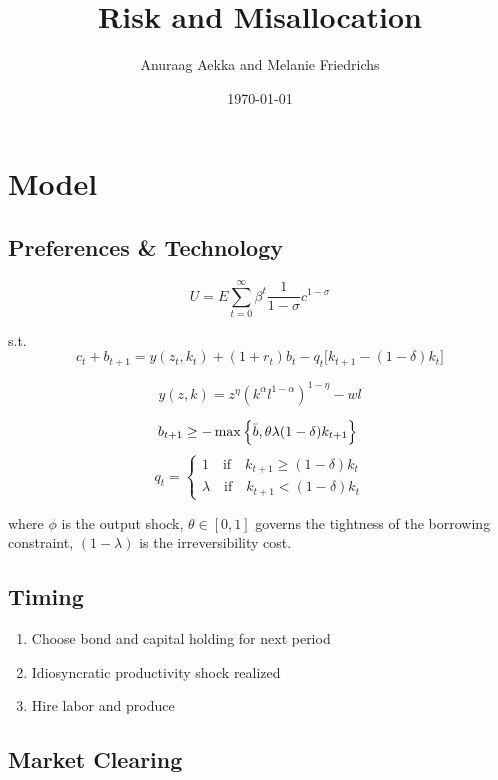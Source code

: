 \documentclass{article}
\title{Risk and Misallocation}
\author{Anuraag Aekka and Melanie Friedrichs}
\date{\today}
\begin{document}
\maketitle

\section{Model}

\subsection{Preferences \& Technology}

\[U= E\sum_{t=0}^{\infty}\beta^t \frac{1}{1-\sigma}c^{1-\sigma} \]


s.t. 
\[c_t + b_{t+1} = y(z_t,k_t) + (1+r_t)b_t - q_{t} \big[k_{t+1} - (1-\delta)k_t \big]\]

\[y(z,k) = z^{\eta}\left(k^{\alpha}l^{1-\alpha}\right)^{1-\eta} - wl\]

\[b_{t+1}\geq -\max\Big\{\Bar{b},\theta\lambda(1-\delta)k_{t+1}\Big\}\  \]
\[q_t =
\begin{cases}
1 \quad \text{if} \quad k_{t+1} \geq (1-\delta)k_t\\
\lambda \quad \text{if}\quad  k_{t+1} < (1-\delta)k_t  
\end{cases}\]



where $\phi$ is the output shock, $\theta \in [0,1]$ governs the tightness of the borrowing constraint, $(1-\lambda)$ is the irreversibility cost.
\iffalse
\[k_{t+1} \leq (1+r)b_t - b_{t+1} + y_t + (1-\delta)k_t\]

\[k_{t+1} \leq (1+r)b_t + \theta\lambda(1-\delta)k_{t+1} + y_t + (1-\delta)k_t\]


\[k_{t+1}\Big(1-\theta\lambda(1-\delta)\Big) \leq (1+r)b_t + y_t + (1-\delta)k_t\]
\[k_{t+1} \leq \frac{(1+r)b_t + y_t + (1-\delta)k_t}{1-\theta\lambda(1-\delta)}\]
\fi
\subsection{Timing}
\begin{enumerate}
\item Choose bond and capital holding for next period
\item Idiosyncratic productivity shock realized
\item Hire labor and produce
\end{enumerate}

\subsection{Market Clearing}
\end{document}
